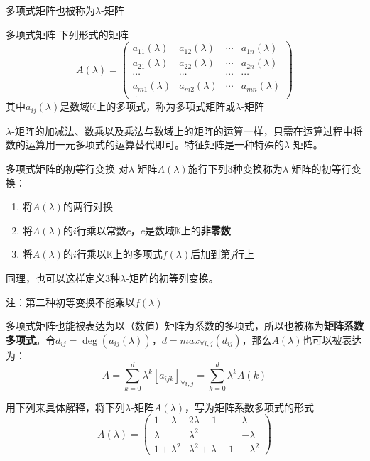 多项式矩阵也被称为$\lambda$-矩阵

\begin{definition}{多项式矩阵}
下列形式的矩阵
$$A(\lambda)=\begin{pmatrix}
a_{11}(\lambda) & a_{12}(\lambda) & \cdots & a_{1n}(\lambda) \\
a_{21}(\lambda) & a_{22}(\lambda) & \cdots & a_{2n}(\lambda) \\
\cdots          & \cdots          & \cdots & \cdots          \\
a_{m1}(\lambda) & a_{m2}(\lambda) & \cdots & a_{mn}(\lambda) \\~.
\end{pmatrix}$$
其中$a_{ij}(\lambda)$是数域$\mathbb{K}$上的多项式，称为多项式矩阵或$\lambda$-矩阵
\end{definition}


$\lambda$-矩阵的加减法、数乘以及乘法与数域上的矩阵的运算一样，只需在运算过程中将数的运算用一元多项式的运算替代即可。特征矩阵是一种特殊的$\lambda$-矩阵。

\begin{definition}{多项式矩阵的初等行变换}
对$\lambda$-矩阵$A(\lambda)$施行下列3种变换称为$\lambda$-矩阵的初等行变换：
\begin{enumerate}
\item 将$A(\lambda)$的两行对换
\item 将$A(\lambda)$的$i$行乘以常数$c$，$c$是数域$\mathbb{K}$上的\textbf{非零数}
\item 将$A(\lambda)$的$i$行乘以$\mathbb{K}$上的多项式$f(\lambda)$后加到第$j$行上
\end{enumerate}
同理，也可以这样定义3种$\lambda$-矩阵的初等列变换。
\end{definition}

注：第二种初等变换不能乘以$f(\lambda)$

多项式矩阵也能被表达为以（数值）矩阵为系数的多项式，所以也被称为\textbf{矩阵系数多项式}。令$d_{ij}=\deg(a_{ij}(\lambda))$，$d=max_{\forall{i,j}}(d_{ij})$，那么$A(\lambda)$也可以被表达为：
\begin{equation}
A=\sum_{k=0}^d\lambda^k[a_{ijk}]_{\forall{i,j}}=\sum_{k=0}^d\lambda^kA(k)
\end{equation}

用下列来具体解释，将下列$\lambda$-矩阵$A(\lambda)$，写为矩阵系数多项式的形式
\begin{equation}
A(\lambda)=
\begin{pmatrix}
1-\lambda   & 2\lambda-1 & \lambda \\
\lambda     & \lambda^2  & -\lambda\\
1+\lambda^2 & \lambda^2+\lambda-1 & -\lambda^2
\end{pmatrix}
\end{equation}

